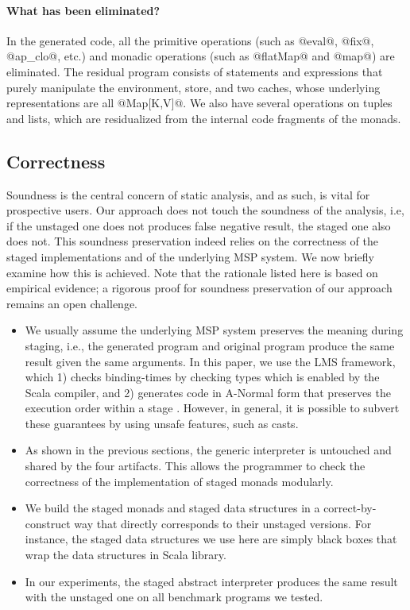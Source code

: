 \paragraph{What has been eliminated?} In the generated code, all the
primitive operations (such as @eval@, @fix@, @ap_clo@, etc.) and monadic
operations (such as @flatMap@ and @map@) are eliminated. The residual program
consists of statements and expressions that purely manipulate the environment,
store, and two caches, whose underlying representations are all @Map[K,V]@.
We also have several operations on tuples and lists, which are residualized from
the internal code fragments of the monads. 

\subsection{Correctness}

Soundness is the central concern of static analysis, and as such, is vital for
prospective users. Our approach does not touch the soundness of the analysis,
i.e, if the unstaged one does not produces false negative result, the staged
one also does not. This soundness preservation indeed relies on the correctness
of the staged implementations and of the underlying MSP system. We now briefly
examine how this is achieved. Note that the rationale listed
here is based on empirical evidence; a rigorous proof for soundness
preservation of our approach remains an open challenge.

\begin{itemize}
  \item We usually assume the underlying MSP system preserves the meaning
    during staging, i.e., the generated program and original program produce
    the same result given the same arguments.
    In this paper, we use the LMS framework, which 1) checks binding-times by
    checking types which is enabled by the Scala compiler, and 2) generates
    code in A-Normal form \cite{Flanagan:1993:ECC:155090.155113} that preserves
    the execution order within a stage \cite{DBLP:conf/birthday/Rompf16}.
    However, in general, it is possible to subvert these guarantees by using
    unsafe features, such as casts.
  \item As shown in the previous sections, the generic interpreter is untouched
    and shared by the four artifacts.  This allows the programmer to
    check the correctness of the implementation of staged monads modularly.
  \item We build the staged monads and staged data structures in a
    correct-by-construct way that directly corresponds to their unstaged
    versions. For instance, the staged data structures we use here are simply
    black boxes that wrap the data structures in Scala library.
  \item In our experiments, the staged abstract interpreter produces the same
    result with the unstaged one on all benchmark programs we tested.
\end{itemize}

